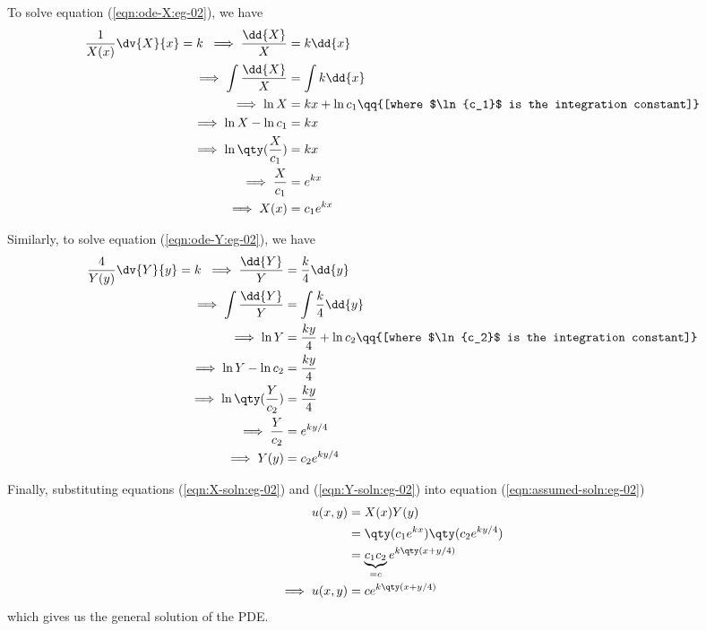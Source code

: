 \begin{enumerate}
            To solve equation (\ref{eqn:ode-X:eg-02}), we have
            \begin{align}
                \dfrac{1}{X(x)}\dv{X}{x}=k\;\implies\dfrac{\dd{X}}{X}&=k\dd{x} \nonumber\\
                \implies\int{\dfrac{\dd{X}}{X}}&=\int{k\dd{x}} \nonumber\\
                \implies\ln{X}&=kx+\ln{c_1}\qq{[where $\ln{c_1}$ is the integration constant]} \nonumber\\
                \implies\ln{X}-\ln{c_1}&=kx \nonumber\\
                \implies\ln\qty(\dfrac{X}{c_1})&=kx \nonumber\\
                \implies\dfrac{X}{c_1}&=e^{kx} \nonumber\\
                \implies X(x)&=c_1e^{kx} \label{eqn:X-soln:eg-02}
            \end{align}

            Similarly, to solve equation (\ref{eqn:ode-Y:eg-02}), we have
            \begin{align}
                \dfrac{4}{Y(y)}\dv{Y}{y}=k\;\implies\dfrac{\dd{Y}}{Y}&=\dfrac{k}{4}\dd{y} \nonumber\\
                \implies\int{\dfrac{\dd{Y}}{Y}}&=\int{\dfrac{k}{4}\dd{y}} \nonumber\\
                \implies\ln{Y}&=\dfrac{ky}{4}+\ln{c_2}\qq{[where $\ln{c_2}$ is the integration constant]} \nonumber\\
                \implies\ln{Y}-\ln{c_2}&=\dfrac{ky}{4} \nonumber\\
                \implies\ln\qty(\dfrac{Y}{c_2})&=\dfrac{ky}{4} \nonumber\\
                \implies\dfrac{Y}{c_2}&=e^{ky/4} \nonumber\\
                \implies Y(y)&=c_2e^{ky/4} \label{eqn:Y-soln:eg-02}
            \end{align}

            Finally, substituting equations (\ref{eqn:X-soln:eg-02}) and (\ref{eqn:Y-soln:eg-02}) into equation (\ref{eqn:assumed-soln:eg-02})
            \begin{align}
                u(x,y)&=X(x)Y(y) \nonumber\\
                    &=\qty(c_1e^{kx})\qty(c_2e^{ky/4}) \nonumber\\
                    &=\underbrace{c_1c_2}_{=c}e^{k\qty(x+y/4)} \nonumber\\
                \implies u(x,y)&=ce^{k\qty(x+y/4)} \label{eqn:gen-soln:eg-02}
            \end{align}
            which gives us the general solution of the PDE.


\end{enumerate}
